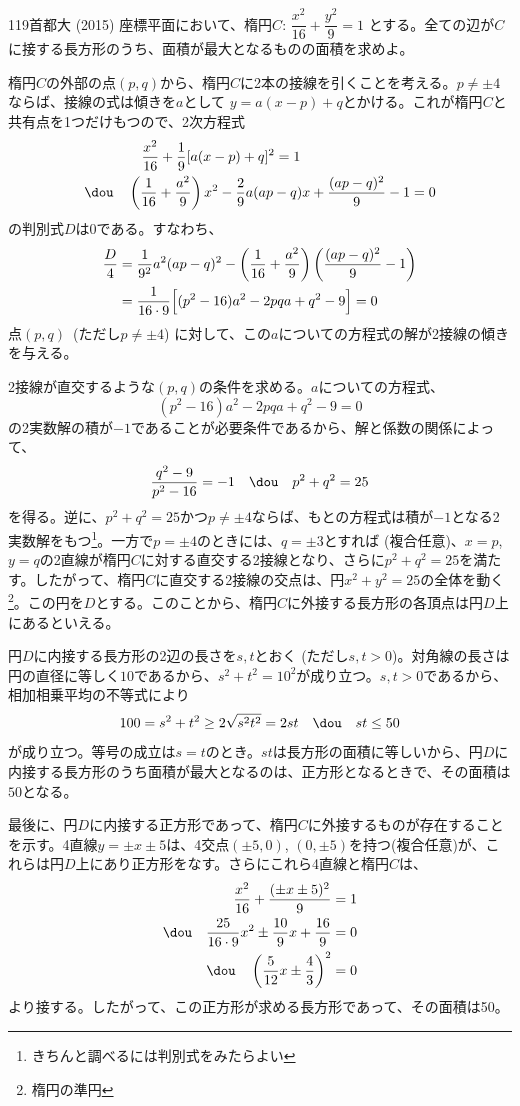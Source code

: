 \begin{prob}{119}{}{首都大 (2015)}
 座標平面において、楕円$C$: $\dfrac{x^2}{16}+\dfrac{y^2}{9}=1$ とする。全ての辺が$C$に接する長方形のうち、面積が最大となるものの面積を求めよ。
\end{prob}
楕円$C$の外部の点$(p, q)$から、楕円$C$に2本の接線を引くことを考える。$p\neq\pm 4$ならば、接線の式は傾きを$a$として $y=a(x-p)+q$とかける。これが楕円$C$と共有点を1つだけもつので、2次方程式
\begin{align*}
 &\quad\frac{x^2}{16}+\frac{1}{9}[a(x-p)+q]^2=1 \\
 \dou\quad &\left(\frac{1}{16}+\frac{a^2}{9}\right)x^2-\frac{2}{9}a(ap-q)x+\frac{(ap-q)^2}{9}-1=0
\end{align*}
の判別式$D$は0である。すなわち、
\begin{align*}
 \frac{D}{4}&=\frac{1}{9^2}a^2(ap-q)^2-\left(\frac{1}{16}+\frac{a^2}{9}\right)\left(\frac{(ap-q)^2}{9}-1\right) \\
 &=\frac{1}{16\cdot9}\Bigl[(p^2-16)a^2-2pqa+q^2-9\Bigr]=0
\end{align*}
点$(p, q)$~(ただし$p\neq\pm 4$) に対して、この$a$についての方程式の解が2接線の傾きを与える。

2接線が直交するような$(p, q)$の条件を求める。$a$についての方程式、
\[ (p^2-16)a^2-2pqa+q^2-9=0 \]
の2実数解の積が$-1$であることが必要条件であるから、解と係数の関係によって、
\[ \frac{q^2-9}{p^2-16}=-1 \quad\dou\quad p^2+q^2=25 \]
を得る。逆に、$p^2+q^2=25$かつ$p\neq\pm 4$ならば、もとの方程式は積が$-1$となる2実数解をもつ\footnote{きちんと調べるには判別式をみたらよい}。一方で$p=\pm 4$のときには、$q=\pm 3$とすれば (複合任意)、$x=p$, $y=q$の2直線が楕円$C$に対する直交する2接線となり、さらに$p^2+q^2=25$を満たす。したがって、楕円$C$に直交する2接線の交点は、円$x^2+y^2=25$の全体を動く\footnote{楕円の準円}。この円を$D$とする。このことから、楕円$C$に外接する長方形の各頂点は円$D$上にあるといえる。

円$D$に内接する長方形の2辺の長さを$s, t$とおく (ただし$s, t>0$)。対角線の長さは円の直径に等しく$10$であるから、$s^2+t^2=10^2$が成り立つ。$s, t>0$であるから、相加相乗平均の不等式により
\[ 100=s^2+t^2\ge 2\sqrt{s^2t^2}=2st \quad\dou\quad st\le 50 \]
が成り立つ。等号の成立は$s=t$のとき。$st$は長方形の面積に等しいから、円$D$に内接する長方形のうち面積が最大となるのは、正方形となるときで、その面積は$50$となる。

最後に、円$D$に内接する正方形であって、楕円$C$に外接するものが存在することを示す。4直線$y=\pm x\pm5$は、4交点$(\pm5, 0)$, $(0, \pm5)$を持つ(複合任意)が、これらは円$D$上にあり正方形をなす。さらにこれら4直線と楕円$C$は、
\begin{align*}
 \frac{x^2}{16}+\frac{(\pm x\pm 5)^2}{9}&=1 \\
 \dou\quad \frac{25}{16\cdot 9}x^2\pm \frac{10}{9}x+\frac{16}{9}&=0 \\
 \dou\quad \left(\frac{5}{12}x \pm \frac{4}{3}\right)^2&=0 \\
\end{align*}
より接する。したがって、この正方形が求める長方形であって、その面積は50。